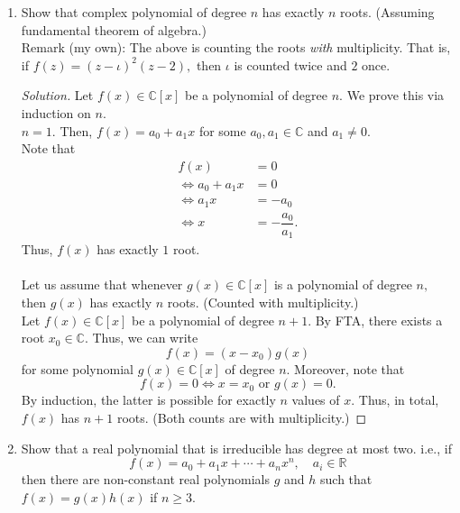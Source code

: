 \documentclass[12pt]{article}
\theoremstyle{definition}
\newenvironment{soln}{\begin{proof}[Solution]}{\end{proof}}
\begin{document}
\begin{enumerate}[leftmargin=*]
	\item  Show that complex polynomial of degree $n$ has exactly $n$ roots. (Assuming fundamental theorem of algebra.)\\
	Remark (my own): The above is counting the roots \emph{with} multiplicity. That is, if $f(z) = (z - \iota)^2(z - 2),$ then $\iota$ is counted twice and $2$ once.
	\begin{soln}
		Let $f(x) \in \mathbb{C}[x]$ be a polynomial of degree $n.$
		We prove this via induction on $n.$\\
		$n = 1.$ Then, $f(x) = a_0 + a_1x$ for some $a_0, a_1 \in \mathbb{C}$ and $a_1 \neq 0.$\\
		Note that
		\begin{align*} 
			f(x) &= 0\\
			\iff a_0 + a_1x &= 0\\
			\iff a_1x &= -a_0\\
			\iff x &= -\dfrac{a_0}{a_1}.
		\end{align*}
		Thus, $f(x)$ has exactly $1$ root.\\~\\
		Let us assume that whenever $g(x) \in \mathbb{C}[x]$ is a polynomial of degree $n,$ then $g(x)$ has exactly $n$ roots. (Counted with multiplicity.)\\
		Let $f(x) \in \mathbb{C}[x]$ be a polynomial of degree $n + 1.$ By FTA, there exists a root $x_0 \in \mathbb{C}.$ Thus, we can write
		\begin{equation*} 
			f(x) = (x - x_0)g(x)
		\end{equation*}
		for some polynomial $g(x) \in \mathbb{C}[x]$ of degree $n.$ Moreover, note that 
		\begin{equation*} 
			f(x) = 0 \iff x = x_0 \text{ or } g(x) = 0.
		\end{equation*}
		By induction, the latter is possible for exactly $n$ values of $x.$ Thus, in total, $f(x)$ has $n + 1$ roots. (Both counts are with multiplicity.)
	\end{soln}
	\item Show that a real polynomial that is irreducible has degree at most two. i.e., if
	\begin{equation*} 
		f(x) = a_0 + a_1x + \cdots + a_nx^n, \quad a_i \in \mathbb{R}
	\end{equation*}
	then there are non-constant real polynomials $g$ and $h$ such that $f(x) = g(x)h(x)$ if $n \ge 3.$\\

\end{enumerate}
\end{document}
